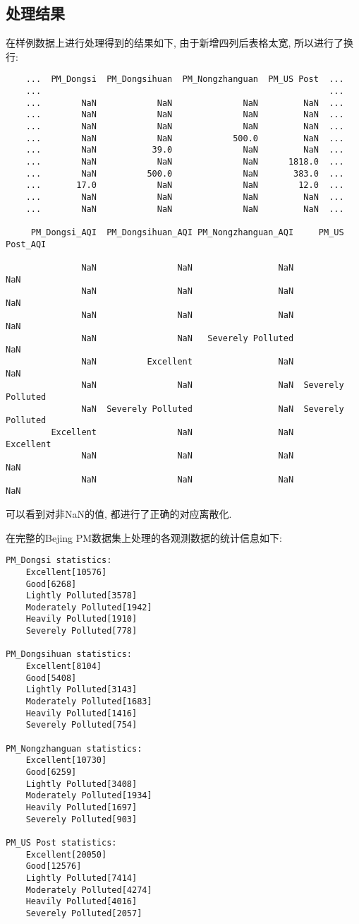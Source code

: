 \subsection{处理结果}
在样例数据上进行处理得到的结果如下, 由于新增四列后表格太宽, 所以进行了换行:
\begin{lstlisting}
    ...  PM_Dongsi  PM_Dongsihuan  PM_Nongzhanguan  PM_US Post  ...    
    ...                                                         ...
    ...        NaN            NaN              NaN         NaN  ...    
    ...        NaN            NaN              NaN         NaN  ...    
    ...        NaN            NaN              NaN         NaN  ...    
    ...        NaN            NaN            500.0         NaN  ...    
    ...        NaN           39.0              NaN         NaN  ...    
    ...        NaN            NaN              NaN      1818.0  ...    
    ...        NaN          500.0              NaN       383.0  ...    
    ...       17.0            NaN              NaN        12.0  ...    
    ...        NaN            NaN              NaN         NaN  ...    
    ...        NaN            NaN              NaN         NaN  ...    

     PM_Dongsi_AQI  PM_Dongsihuan_AQI PM_Nongzhanguan_AQI     PM_US Post_AQI
                                                                            
               NaN                NaN                 NaN                NaN
               NaN                NaN                 NaN                NaN
               NaN                NaN                 NaN                NaN
               NaN                NaN   Severely Polluted                NaN
               NaN          Excellent                 NaN                NaN
               NaN                NaN                 NaN  Severely Polluted
               NaN  Severely Polluted                 NaN  Severely Polluted
         Excellent                NaN                 NaN          Excellent
               NaN                NaN                 NaN                NaN
               NaN                NaN                 NaN                NaN
\end{lstlisting}
可以看到对非NaN的值, 都进行了正确的对应离散化.

在完整的Bejing PM数据集上处理的各观测数据的统计信息如下:
\begin{lstlisting}
PM_Dongsi statistics:
    Excellent[10576]
    Good[6268]
    Lightly Polluted[3578]
    Moderately Polluted[1942]
    Heavily Polluted[1910]
    Severely Polluted[778]

PM_Dongsihuan statistics:
    Excellent[8104]
    Good[5408]
    Lightly Polluted[3143]
    Moderately Polluted[1683]
    Heavily Polluted[1416]
    Severely Polluted[754]

PM_Nongzhanguan statistics:
    Excellent[10730]
    Good[6259]
    Lightly Polluted[3408]
    Moderately Polluted[1934]
    Heavily Polluted[1697]
    Severely Polluted[903]

PM_US Post statistics:
    Excellent[20050]
    Good[12576]
    Lightly Polluted[7414]
    Moderately Polluted[4274]
    Heavily Polluted[4016]
    Severely Polluted[2057]
\end{lstlisting}

